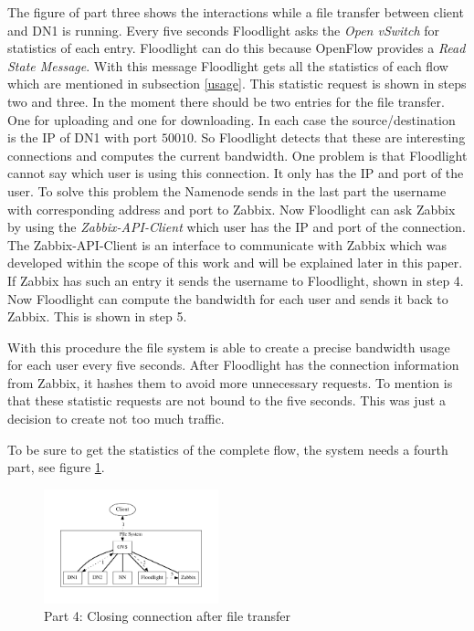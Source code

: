 The figure of part three shows the interactions while a file transfer between client and DN1 is running. Every five seconds Floodlight asks the \textit{Open vSwitch} for statistics of each entry. Floodlight can do this because OpenFlow provides a \textit{Read State Message}\cite[p. 30]{ofspec}. With this message Floodlight gets all the statistics of each flow which are mentioned in subsection \ref{usage}. This statistic request is shown in steps two and three. In the moment there should be two entries for the file transfer. One for uploading and one for downloading. In each case the source/destination is the IP of DN1 with port $50010$. So Floodlight detects that these are interesting connections and computes the current bandwidth. One problem is that Floodlight cannot say which user is using this connection. It only has the IP and port of the user. To solve this problem the Namenode sends in the last part the username with corresponding address and port to Zabbix. Now Floodlight can ask Zabbix by using the \textit{Zabbix-API-Client} which user has the IP and port of the connection. The Zabbix-API-Client is an interface to communicate with Zabbix which was developed within the scope of this work and will be explained later in this paper. If Zabbix has such an entry it sends the username to Floodlight, shown in step 4. Now Floodlight can compute the bandwidth for each user and sends it back to Zabbix. This is shown in step 5.

With this procedure the file system is able to create a precise bandwidth usage for each user every five seconds. After Floodlight has the connection information from Zabbix, it hashes them to avoid more unnecessary requests. To mention is that these statistic requests are not bound to the five seconds. This was just a decision to create not too much traffic.

To be sure to get the statistics of the complete flow, the system needs a fourth part, see figure \ref{cc}.  

\begin{figure}[htp]
\centering
\includegraphics[width=0.45\textwidth]{img/closeConnection} 
\caption{Part 4: Closing connection after file transfer}
\label{cc}
\end{figure}

